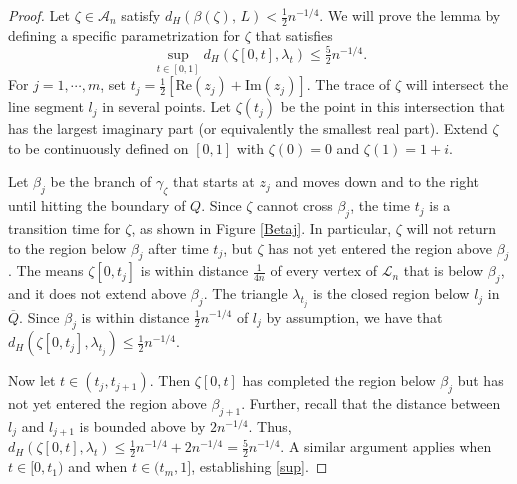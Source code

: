 \documentclass[preprint,12pt]{elsarticle}
\theoremstyle{definition}
\theoremstyle{remark}
\numberwithin{equation}{section}
\begin{document}
\begin{proof}
Let $\zeta \in  \mathcal{A}_n $ satisfy $d_H\left(\beta(\zeta), \, L \right) < \tfrac{1}{2} n^{-1/4}$.
We will prove the lemma by defining a specific parametrization for $\zeta$ that satisfies
\begin{equation}\label{sup}
\sup_{t \in [0,1]} d_H\left( \zeta[0,t], \lambda_t \right) \leq \tfrac{5}{2}n^{-1/4}.
\end{equation}
For $j = 1, \cdots, m$, set $t_j = \frac{1}{2} [ \text{Re}(z_j) + \text{Im}(z_j) ]$.
The trace of $\zeta$ will intersect the line segment $l_j$ in several points.  
Let $\zeta(t_j)$ be the point in this intersection that has the largest imaginary part (or equivalently the smallest real part).
Extend $\zeta$ to be continuously defined on $[0,1]$ with $\zeta(0) = 0$ and $\zeta(1) = 1+i$.

Let $\beta_j$ be the branch of $\gamma_\zeta$ that starts at $z_j$ and moves down and to the right until hitting the boundary of $Q$.
Since $\zeta$ cannot cross $\beta_j$, the time $t_j$ is a transition time for $\zeta$, as shown in Figure \ref{Betaj}. In particular,   $\zeta$ will not return to the region below $\beta_j$ after time $t_j$, but $\zeta$ has not yet entered the region above $\beta_j$.
The means $\zeta[0,t_j]$ is within distance $\frac{1}{4n}$ of every vertex of $\mathcal{L}_n$ that is below $\beta_j$, and it does not extend above $\beta_j$.
The triangle $\lambda_{t_j}$ is the closed region below $l_j$ in $\overline{Q}$.
Since $\beta_j$ is within distance $\frac{1}{2} n^{-1/4}$ of $l_j$ by assumption, we have that
 $d_H\left( \zeta[0,t_j], \lambda_{t_j} \right) \leq \frac{1}{2} n^{-1/4}$.

Now let $t \in (t_j, t_{j+1})$.  
Then $\zeta[0,t]$ has completed the region below $\beta_j$ but has not yet entered the region above $\beta_{j+1}$.  Further, recall that the distance between $l_j$ and $ l_{j+1}$ is bounded above by $2n^{-1/4}$. 
Thus,
 $d_H\left( \zeta[0,t], \lambda_{t} \right) \leq \frac{1}{2} n^{-1/4}+2n^{-1/4} = \frac{5}{2}n^{-1/4}$.
 A similar argument applies when $t \in [0,t_1)$ and when $t \in (t_m, 1]$, establishing \eqref{sup}.

\end{proof}
\end{document}
